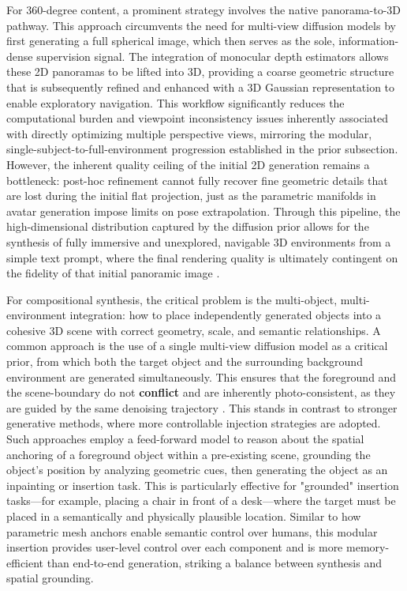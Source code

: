 \documentclass[11pt,a4paper]{article}
\begin{document}
For 360-degree content, a prominent strategy involves the native panorama-to-3D pathway. This approach circumvents the need for multi-view diffusion models by first generating a full spherical image, which then serves as the sole, information-dense supervision signal. The integration of monocular depth estimators allows these 2D panoramas to be lifted into 3D, providing a coarse geometric structure that is subsequently refined and enhanced with a 3D Gaussian representation to enable exploratory navigation. This workflow significantly reduces the computational burden and viewpoint inconsistency issues inherently associated with directly optimizing multiple perspective views, mirroring the modular, single-subject-to-full-environment progression established in the prior subsection. However, the inherent quality ceiling of the initial 2D generation remains a bottleneck: post-hoc refinement cannot fully recover fine geometric details that are lost during the initial flat projection, just as the parametric manifolds in avatar generation impose limits on pose extrapolation. Through this pipeline, the high-dimensional distribution captured by the diffusion prior allows for the synthesis of fully immersive and unexplored, navigable 3D environments from a simple text prompt, where the final rendering quality is ultimately contingent on the fidelity of that initial panoramic image \cite{arxiv:2310.07204v1,arxiv:2312.03203v3}.

For compositional synthesis, the critical problem is the multi-object, multi-environment integration: how to place independently generated objects into a cohesive 3D scene with correct geometry, scale, and semantic relationships. A common approach is the use of a single multi-view diffusion model as a critical prior, from which both the target object and the surrounding background environment are generated simultaneously. This ensures that the foreground and the scene-boundary do not \textbf{conflict} and are inherently photo-consistent, as they are guided by the same denoising trajectory \cite{arxiv:2405.11616v2}. This stands in contrast to stronger generative methods, where more controllable injection strategies are adopted. Such approaches employ a feed-forward model to reason about the spatial anchoring of a foreground object within a pre-existing scene, grounding the object's position by analyzing geometric cues, then generating the object as an inpainting or insertion task. This is particularly effective for "grounded" insertion tasks---for example, placing a chair in front of a desk---where the target must be placed in a semantically and physically plausible location. Similar to how parametric mesh anchors enable semantic control over humans, this modular insertion provides user-level control over each component and is more memory-efficient than end-to-end generation, striking a balance between synthesis and spatial grounding.
\end{document}
